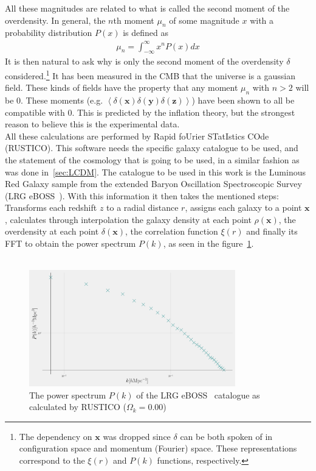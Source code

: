 All these magnitudes are related to what is called the second moment of the overdensity. In general, the $n$th moment $\mu_n$ of some magnitude $x$ with a probability distribution $P(x)$ is defined as 
\begin{align}
	\mu_n = \int_{-\infty}^{\infty} x^{n}P(x)dx 
	\label{eq:n-moment}
\end{align}
It is then natural to ask why is only the second moment of the overdensity $\delta$ considered.\footnote{The dependency on $\textbf{x}$ was dropped since $\delta$ can be both spoken of in configuration space and momentum (Fourier) space. These representations correspond to the $\xi(r)$ and $P(k)$ functions, respectively.}
It has been measured in the CMB that the universe is a gaussian field. These kinds of fields have the property that any moment $\mu_n$ with $n>2$ will be 0. These moments (e.g. $ \left<\delta(\textbf{x}) \delta(\textbf{y}) \delta(\textbf{z}) \right>$) have been shown to all be compatible with 0. This is predicted by the inflation theory, but the strongest reason to believe this is the experimental data.\\

All these calculations are performed by Rapid foUrier STatIstics COde (RUSTICO)\cite{rustico}. This software needs the specific galaxy catalogue to be used, and the statement of the cosmology that is going to be used, in a similar fashion as was done in~\ref{sec:LCDM}. The catalogue to be used in this work is the Luminous Red Galaxy sample from the extended Baryon Oscillation Spectroscopic Survey (LRG eBOSS~\cite{eBoss}).
With this information it then takes the mentioned steps: Transforms each redshift $z$ to a radial distance $r$, assigns each galaxy to a point $\textbf{x}$, calculates through interpolation the galaxy density at each point $\rho\left(  \textbf{x}\right)$, the overdensity at each point $\delta\left( \textbf{x} \right)$, the correlation function $\xi(r)$ and finally its FFT to obtain the power spectrum $P(k)$, as seen in the figure~\ref{fig:rustico}. \\\\


\begin{figure}[t]
	\centering
	\includegraphics[width=0.8\textwidth]{../figs/Pkrustico.png}
	\caption{The power spectrum $P(k)$ of the LRG eBOSS~\cite{eBoss} catalogue as calculated by RUSTICO ($\Omega_k = 0.00$)}
	\label{fig:rustico}
\end{figure}

